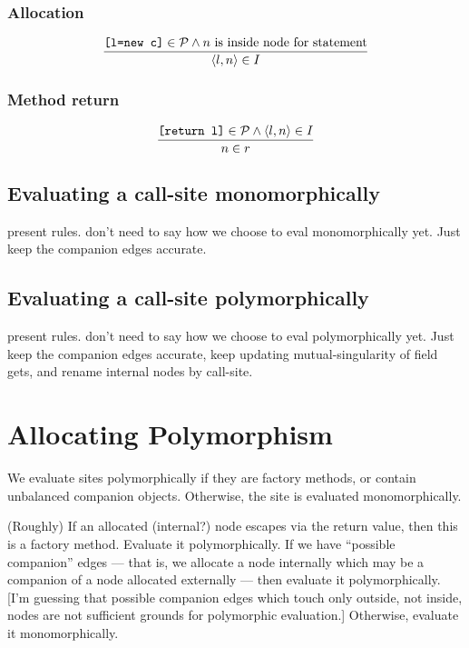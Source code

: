 \documentclass[11pt,notitlepage]{article}
\begin{document}
\subsubsection{Allocation}

\begin{displaymath}
\dfrac
{\text{\tt [l=new c]}\in\mathcal{P} \wedge
 n \text{ is inside node for statement} }
{\left\langle l,n \right\rangle\in I}
\end{displaymath}

\subsubsection{Method return}

\begin{displaymath}
\dfrac
{\text{\tt [return l]}\in\mathcal{P} \wedge
 \left\langle l,n \right\rangle\in I}
{n\in r}
\end{displaymath}


\subsection{Evaluating a call-site monomorphically}

present rules.  don't need to say how we choose to eval
monomorphically yet.  Just keep the companion edges accurate.

\subsection{Evaluating a call-site polymorphically}

present rules.  don't need to say how we choose to eval
polymorphically yet.  Just keep the companion edges accurate,
keep updating mutual-singularity of field gets,
and rename internal nodes by call-site.

\section{Allocating Polymorphism}

We evaluate sites polymorphically if they are factory methods, or
contain unbalanced companion objects.  Otherwise, the site is
evaluated monomorphically.

(Roughly) If an allocated (internal?) node escapes via the return
value, then this is a factory method.  Evaluate it polymorphically.
If we have ``possible companion'' edges --- that is, we allocate
a node internally which may be a companion of a node allocated
externally --- then evaluate it polymorphically.  [I'm guessing
that possible companion edges which touch only outside, not inside,
nodes are not sufficient grounds for polymorphic evaluation.]
Otherwise, evaluate it monomorphically.
\end{document}
